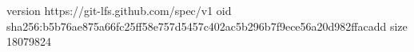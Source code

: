 version https://git-lfs.github.com/spec/v1
oid sha256:b5b76ae875a66fc25ff58e757d5457c402ac5b296b7f9ece56a20d982ffacadd
size 18079824
